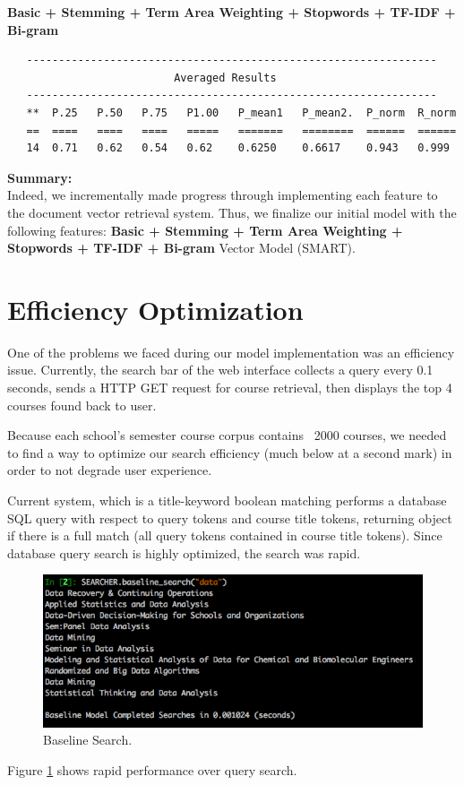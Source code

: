 \documentclass[twoside]{article}
\begin{document}
\textbf{Basic + Stemming + Term Area Weighting + Stopwords + TF-IDF + Bi-gram}
\begin{verbatim}
   ----------------------------------------------------------------
                          Averaged Results
   ----------------------------------------------------------------
   **  P.25   P.50   P.75   P1.00   P_mean1   P_mean2.  P_norm  R_norm
   ==  ====   ====   ====   =====   =======   ========  ======  ======
   14  0.71   0.62   0.54   0.62    0.6250    0.6617    0.943   0.999
\end{verbatim}

\textbf{Summary:}\\
Indeed, we incrementally made progress through implementing each feature to the document vector retrieval system. Thus, we finalize our initial model with the following features: \textbf{Basic + Stemming + Term Area Weighting + Stopwords + TF-IDF + Bi-gram} Vector Model (SMART).

\vfill
\pagebreak

\section{Efficiency Optimization}

One of the problems we faced during our model implementation was an efficiency issue. Currently, the search bar of the web interface collects a query every 0.1 seconds, sends a HTTP GET request for course retrieval, then displays the top 4 courses found back to user.

Because each school's semester course corpus contains ~2000 courses, we needed to find a way to optimize our search efficiency (much below at a second mark) in order to not degrade user experience.

Current system, which is a  title-keyword boolean matching performs a database SQL query with respect to query tokens and course title tokens, returning object if there is a full match (all query tokens contained in course title tokens). Since database query search is highly optimized, the search was rapid. 

\begin{figure}
  \includegraphics[width=\linewidth]{Images/1.png}
  \caption{Baseline Search.}
  \label{fig:baseline_search}
\end{figure}
Figure \ref{fig:baseline_search} shows rapid performance over query search.
\end{document}
